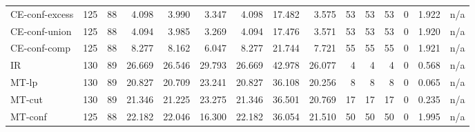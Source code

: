 \begin{table}[htbp]
\begin{tabular}{lrrrrrrrrrrrrrr}
CE-conf-excess & 125 & 88 & 4.098 & 3.990 & 3.347 & 4.098 & 17.482 & 3.575 & 53 & 53 & 53 & 0 & 1.922 & n/a \\
CE-conf-union & 125 & 88 & 4.094 & 3.985 & 3.269 & 4.094 & 17.476 & 3.571 & 53 & 53 & 53 & 0 & 1.920 & n/a \\
CE-conf-comp & 125 & 88 & 8.277 & 8.162 & 6.047 & 8.277 & 21.744 & 7.721 & 55 & 55 & 55 & 0 & 1.921 & n/a \\
IR & 130 & 89 & 26.669 & 26.546 & 29.793 & 26.669 & 42.978 & 26.077 & 4 & 4 & 4 & 0 & 0.568 & n/a \\
MT-lp & 130 & 89 & 20.827 & 20.709 & 23.241 & 20.827 & 36.108 & 20.256 & 8 & 8 & 8 & 0 & 0.065 & n/a \\
MT-cut & 130 & 89 & 21.346 & 21.225 & 23.275 & 21.346 & 36.501 & 20.769 & 17 & 17 & 17 & 0 & 0.235 & n/a \\
MT-conf & 125 & 88 & 22.182 & 22.046 & 16.300 & 22.182 & 36.054 & 21.510 & 50 & 50 & 50 & 0 & 1.995 & n/a \\
\bottomrule
\end{tabular}
\end{table}
